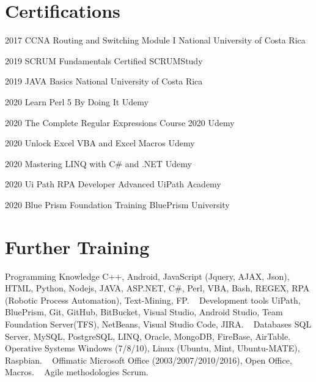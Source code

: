\documentclass[]{friggeri-cv}
\begin{document}
\section{Certifications}
\begin{entrylist}

    \entry
    {2017}
    {CCNA Routing and Switching Module I}
    {National University of Costa Rica}

    \entry
    {2019}
    {SCRUM Fundamentals Certified}
    {SCRUMStudy}
    
    \entry
    {2019}
    {JAVA Basics}
    {National University of Costa Rica}
    
    \entry
    {2020}
    {Learn Perl 5 By Doing It}
    {Udemy}
    
    \entry
    {2020}
    {The Complete Regular Expressions Course 2020}
    {Udemy}
    
    \entry
    {2020}
    {Unlock Excel VBA and Excel Macros}
    {Udemy}
    
    \entry
    {2020}
    {Mastering LINQ with C# and .NET}
    {Udemy}
    
    \entry
    {2020}
    {Ui Path RPA Developer Advanced}
    {UiPath Academy}
    
    \entry
    {2020}
    {Blue Prism Foundation Training}
    {BluePrism University}
    
\end{entrylist}

\section{Further Training}
\begin{entrylist}
    \entry
    {}
    {Programming Knowledge}
    {}
    {C++, Android, JavaScript (Jquery, AJAX, Json), HTML, Python, Nodejs, JAVA, ASP.NET, C\#, Perl, VBA, Bash, REGEX, RPA (Robotic Process Automation), Text-Mining, FP.}
    ~
    \entry
    {}
    {Development tools}
    {}
    {UiPath, BluePrism, Git, GitHub, BitBucket, Visual Studio, Android Studio, Team Foundation Server(TFS), NetBeans, Visual Studio Code, JIRA.}
    ~
    \entry
    {}
    {Databases}
    {}
    {SQL Server, MySQL, PostgreSQL, LINQ, Oracle, MongoDB, FireBase, AirTable.}
    ~
    \entry
    {}
    {Operative Systems}
    {}
    {Windows (7/8/10), Linux (Ubuntu, Mint, Ubuntu-MATE), Raspbian.}
    ~
    \entry
    {}
    {Offimatic}
    {}
    {Microsoft Office (2003/2007/2010/2016), Open Office, Macros.}
    ~
    \entry
    {}
    {Agile methodologies}
    {}
    {Scrum.}
    
\end{entrylist}
\end{document}
